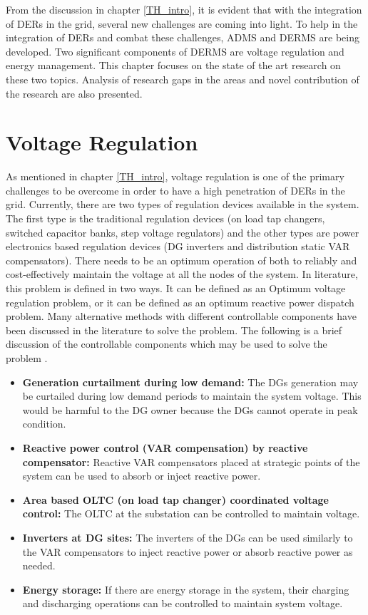 From the discussion in chapter \ref{TH_intro}, it is evident that with the integration of DERs in the grid, several new challenges are coming into light. To help in the integration of DERs and combat these challenges, ADMS and DERMS are being developed. Two significant components of DERMS are voltage regulation and energy management. This chapter focuses on the state of the art research on these two topics. Analysis of research gaps in the areas and novel contribution of the research are also presented. 
\section{Voltage Regulation}
As mentioned in chapter \ref{TH_intro}, voltage regulation is one of the primary challenges to be overcome in order to have a high penetration of DERs in the grid. Currently, there are two types of regulation devices available in the system. The first type is the traditional regulation devices (on load tap changers, switched capacitor banks, step voltage regulators) and the other types are power electronics based regulation devices (DG inverters and distribution static VAR compensators). There needs to be an optimum operation of both to reliably and cost-effectively maintain the voltage at all the nodes of the system. In literature, this problem is defined in two ways. It can be defined as an Optimum voltage regulation problem, or it can be defined as an optimum reactive power dispatch problem. Many alternative methods with different controllable components have been discussed in the literature to solve the problem. The following is a brief discussion of the controllable components which may be used to solve the problem \cite{VC_1}. 
\begin{itemize}
    \item \textbf{Generation curtailment during low demand:} The DGs generation may be curtailed during low demand periods to maintain the system voltage. This would be harmful to the DG owner because the DGs cannot operate in peak condition.
    \item \textbf{Reactive power control (VAR compensation) by reactive compensator:} Reactive VAR compensators placed at strategic points of the system can be used to absorb or inject reactive power.  
    \item \textbf{Area based OLTC (on load tap changer) coordinated voltage control:} The OLTC at the substation can be controlled to maintain voltage.
    \item \textbf{Inverters at DG sites:} The inverters of the DGs can be used similarly to the VAR compensators to inject reactive power or absorb reactive power as needed.
    \item \textbf{Energy storage:} If there are energy storage in the system, their charging and discharging operations can be controlled to maintain system voltage.
\end{itemize}

